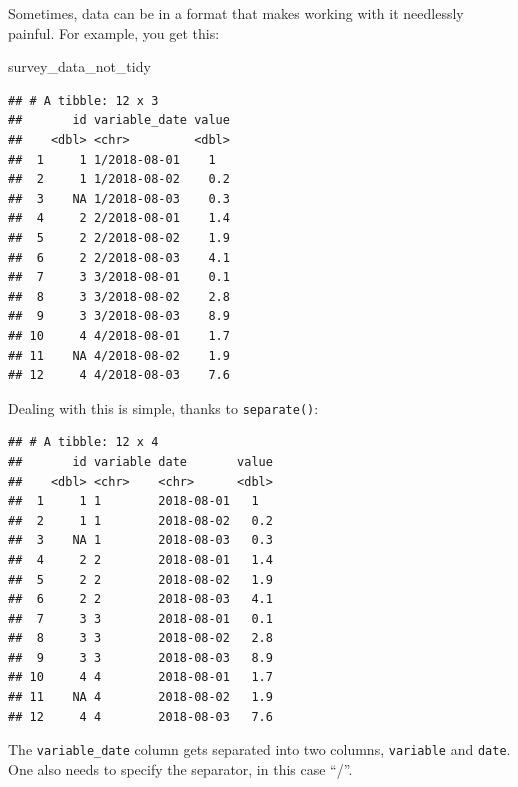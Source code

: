 \documentclass[]{gitbook}
\newenvironment{Shaded}{\begin{snugshade}}{\end{snugshade}}
\newcommand{\DataTypeTok}[1]{\textcolor[rgb]{0.13,0.29,0.53}{#1}}
\newcommand{\KeywordTok}[1]{\textcolor[rgb]{0.13,0.29,0.53}{\textbf{#1}}}
\newcommand{\NormalTok}[1]{#1}
\newcommand{\OperatorTok}[1]{\textcolor[rgb]{0.81,0.36,0.00}{\textbf{#1}}}
\newcommand{\StringTok}[1]{\textcolor[rgb]{0.31,0.60,0.02}{#1}}
\begin{document}
Sometimes, data can be in a format that makes working with it needlessly painful. For example, you
get this:

\begin{Shaded}
\begin{Highlighting}[]
\NormalTok{survey_data_not_tidy}
\end{Highlighting}
\end{Shaded}

\begin{verbatim}
## # A tibble: 12 x 3
##       id variable_date value
##    <dbl> <chr>         <dbl>
##  1     1 1/2018-08-01    1  
##  2     1 1/2018-08-02    0.2
##  3    NA 1/2018-08-03    0.3
##  4     2 2/2018-08-01    1.4
##  5     2 2/2018-08-02    1.9
##  6     2 2/2018-08-03    4.1
##  7     3 3/2018-08-01    0.1
##  8     3 3/2018-08-02    2.8
##  9     3 3/2018-08-03    8.9
## 10     4 4/2018-08-01    1.7
## 11    NA 4/2018-08-02    1.9
## 12     4 4/2018-08-03    7.6
\end{verbatim}

Dealing with this is simple, thanks to \texttt{separate()}:

\begin{Shaded}
\end{Shaded}

\begin{verbatim}
## # A tibble: 12 x 4
##       id variable date       value
##    <dbl> <chr>    <chr>      <dbl>
##  1     1 1        2018-08-01   1  
##  2     1 1        2018-08-02   0.2
##  3    NA 1        2018-08-03   0.3
##  4     2 2        2018-08-01   1.4
##  5     2 2        2018-08-02   1.9
##  6     2 2        2018-08-03   4.1
##  7     3 3        2018-08-01   0.1
##  8     3 3        2018-08-02   2.8
##  9     3 3        2018-08-03   8.9
## 10     4 4        2018-08-01   1.7
## 11    NA 4        2018-08-02   1.9
## 12     4 4        2018-08-03   7.6
\end{verbatim}

The \texttt{variable\_date} column gets separated into two columns, \texttt{variable} and \texttt{date}. One also needs
to specify the separator, in this case ``/''.
\end{document}

